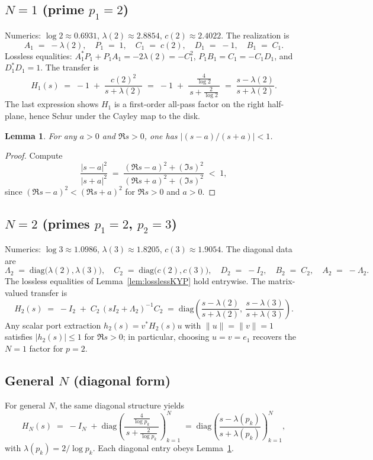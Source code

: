 \documentclass[11pt]{article}
\newtheorem{lemma}[theorem]{Lemma}
\theoremstyle{definition}
\theoremstyle{remark}
\begin{document}
\subsection*{$N=1$ (prime $p_1=2$)}
Numerics: \(\log 2\approx 0.6931\), \(\lambda(2)\approx 2.8854\), \(c(2)\approx 2.4022\). The realization is
\[
 A_1\;=\;-\lambda(2),\quad P_1\;=\;1,\quad C_1\;=\;c(2),\quad D_1\;=\;-1,\quad B_1\;=\;C_1.
\]
Lossless equalities: \(A_1^*P_1+P_1A_1=-2\lambda(2)=-C_1^2\), \(P_1B_1=C_1=-C_1 D_1\), and \(D_1^*D_1=1\). The transfer is
\[
 H_1(s)\;=\;-1\; +\; \frac{c(2)^2}{s+\lambda(2)}\;=\;-1\; +\;\frac{\tfrac{4}{\log 2}}{\,s+\tfrac{2}{\log 2}\,}\;=\;\frac{s-\lambda(2)}{s+\lambda(2)}.
\]
The last expression shows \(H_1\) is a first-order all-pass factor on the right half-plane, hence Schur under the Cayley map to the disk.

\begin{lemma}\label{lem:moebius-contract}
For any \(a>0\) and \(\Re s>0\), one has \(\big|(s-a)/(s+a)\big|<1\).
\end{lemma}
\begin{proof}
Compute
\[
 \frac{|s-a|^2}{|s+a|^2}\;=\;\frac{(\Re s-a)^2+(\Im s)^2}{(\Re s+a)^2+(\Im s)^2}\;<\;1,
\]
since \((\Re s-a)^2<(\Re s+a)^2\) for \(\Re s>0\) and \(a>0\).
\end{proof}

\subsection*{$N=2$ (primes $p_1=2$, $p_2=3$)}
Numerics: \(\log 3\approx 1.0986\), \(\lambda(3)\approx 1.8205\), \(c(3)\approx 1.9054\). The diagonal data are
\[
 \Lambda_2\;=\;\mathrm{diag}\big(\lambda(2),\lambda(3)\big),\quad C_2\;=\;\mathrm{diag}\big(c(2),c(3)\big),\quad D_2\;=\;-I_2,\quad B_2\;=\;C_2,\quad A_2\;=\;-\Lambda_2.
\]
The lossless equalities of Lemma~\ref{lem:losslessKYP} hold entrywise. The matrix-valued transfer is
\[
 H_2(s)\;=\;-I_2\; +\; C_2\,(sI_2+\Lambda_2)^{-1} C_2\;=\;\mathrm{diag}\!\left(\frac{s-\lambda(2)}{s+\lambda(2)},\ \frac{s-\lambda(3)}{s+\lambda(3)}\right).
\]
Any scalar port extraction \(h_2(s)=v^*H_2(s)u\) with \(\|u\|=\|v\|=1\) satisfies \(|h_2(s)|\le 1\) for \(\Re s>0\); in particular, choosing \(u=v=e_1\) recovers the \(N=1\) factor for \(p=2\).

\subsection*{General $N$ (diagonal form)}
For general \(N\), the same diagonal structure yields
\[
 H_N(s)\;=\;-I_N\; +\; \mathrm{diag}\!\left(\frac{\tfrac{4}{\log p_k}}{\,s+\tfrac{2}{\log p_k}\,}\right)_{k=1}^N\;=\;\mathrm{diag}\!\left(\frac{s-\lambda(p_k)}{s+\lambda(p_k)}\right)_{k=1}^N,
\]
with \(\lambda(p_k)=2/\log p_k\). Each diagonal entry obeys Lemma~\ref{lem:moebius-contract}.
\end{document}
